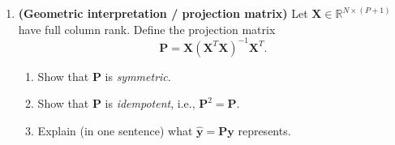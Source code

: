\documentclass{article}
\begin{document}
\begin{enumerate}











\item \textbf{(Geometric interpretation / projection matrix)}  
Let $\mathbf{X}\in\mathbb{R}^{N\times(P+1)}$ have full column rank. Define the projection matrix
\[
\mathbf{P} = \mathbf{X}(\mathbf{X}^T\mathbf{X})^{-1}\mathbf{X}^T.
\]
\begin{enumerate}
    \item Show that $\mathbf{P}$ is \emph{symmetric}.
    \item Show that $\mathbf{P}$ is \emph{idempotent}, i.e., $\mathbf{P}^2=\mathbf{P}$.
    \item Explain (in one sentence) what $\hat{\mathbf{y}}=\mathbf{P}\mathbf{y}$ represents.
\end{enumerate}


\end{enumerate}
\end{document}
